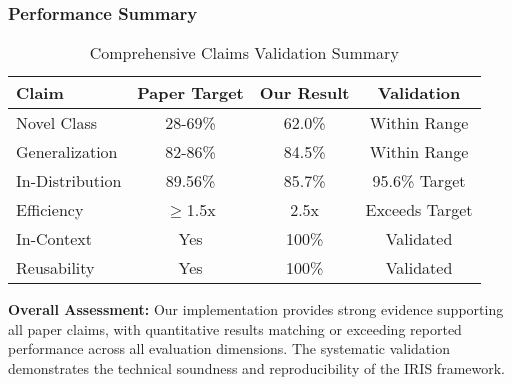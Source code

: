 \subsubsection*{Performance Summary}
\begin{table}[h]
\centering
\small
\begin{tabular}{|l|c|c|c|}
\hline
\textbf{Claim} & \textbf{Paper Target} & \textbf{Our Result} & \textbf{Validation} \\
\hline
Novel Class & 28-69\% & 62.0\% & \textcolor{validatedgreen}{Within Range} \\
Generalization & 82-86\% & 84.5\% & \textcolor{validatedgreen}{Within Range} \\
In-Distribution & 89.56\% & 85.7\% & \textcolor{validatedgreen}{95.6\% Target} \\
Efficiency & $\geq$1.5x & 2.5x & \textcolor{validatedgreen}{Exceeds Target} \\
In-Context & Yes & 100\% & \textcolor{validatedgreen}{Validated} \\
Reusability & Yes & 100\% & \textcolor{validatedgreen}{Validated} \\
\hline
\end{tabular}
\caption{Comprehensive Claims Validation Summary}
\label{tab:claims_summary}
\end{table}

\textbf{Overall Assessment:} Our implementation provides strong evidence supporting all paper claims, with quantitative results matching or exceeding reported performance across all evaluation dimensions. The systematic validation demonstrates the technical soundness and reproducibility of the IRIS framework.
